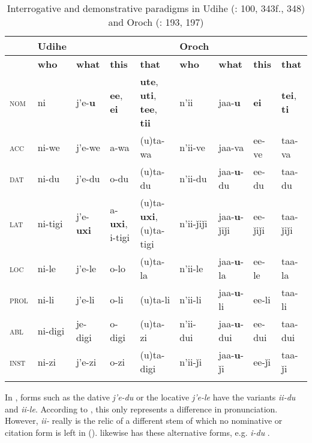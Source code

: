 \begin{table}
\caption{Interrogative and demonstrative paradigms in Udihe (\citealt{NikolaevaTolskaya2001}: 100, 343f., 348) and Oroch (\citealt{AvrorinBoldyrev2001}: 193, 197)}
\label{tab:tungu:24}
\small
\begin{tabularx}{\textwidth}{llllQllll}
\lsptoprule
& \textbf{Udihe} &  &  &  & \textbf{Oroch} &  &  & \\
\midrule
& \textbf{who} & \textbf{what} & \textbf{this} & \textbf{that} & \textbf{who} & \textbf{what} & \textbf{this} & \textbf{that}\\
\midrule 
\textsc{nom} & ni & j’e-\textbf{u} & \textbf{ee}, \textbf{ei} & \textbf{ute}, \textbf{uti}, \textbf{tee}, \textbf{tii} & n’ii & jaa-\textbf{u} & \textbf{ei} & \textbf{tei}, \textbf{ti}\\
\textsc{acc} & ni-we & j’e-we & a-wa & (u)ta-wa & n’ii-ve & jaa-va & ee-ve & taa-va\\
\textsc{dat} & ni-du & j’e-du & o-du & (u)ta-du & n’ii-du & jaa-\textbf{u}-du & ee-du & taa-du\\
\textsc{lat} & ni-tigi & j’e-\textbf{uxi} & a-\textbf{uxi}, i-tigi & \mbox{(u)ta-\textbf{uxi}}, \mbox{(u)ta-tigi} & n’ii-ǰiǰi & jaa-\textbf{u}-ǰiǰi & ee-ǰiǰi & taa-ǰiǰi\\
\textsc{loc} & ni-le & j’e-le & o-lo & (u)ta-la & n’ii-le & jaa-\textbf{u}-la & ee-le & taa-la\\
\textsc{prol} & ni-li & j’e-li & o-li & (u)ta-li & n’ii-li & jaa-\textbf{u}-li & ee-li & taa-li\\
\textsc{abl} & ni-digi & je-digi & o-digi & (u)ta-zi & n’ii-dui & jaa-\textbf{u}-dui & ee-dui & taa-dui\\
\textsc{inst} & ni-zi & j’e-zi & o-zi & \mbox{(u)ta-digi} & n’ii-ǰi & jaa-\textbf{u}-ǰi & ee-ǰi & taa-ǰi\\
\lspbottomrule
\end{tabularx}
\end{table}

In , forms such as the dative \textit{j’e-du} or the locative \textit{j’e-le} have the variants \textit{ii-du} and \textit{ii-le}. According to \citet[349]{NikolaevaTolskaya2001}, this only represents a difference in pronunciation. However, \textit{ii-} really is the relic of a different stem of which no nominative or citation form is left in  ().  likewise has these alternative forms, e.g. \textit{i-du} \citep{Schmidt1928a}.

